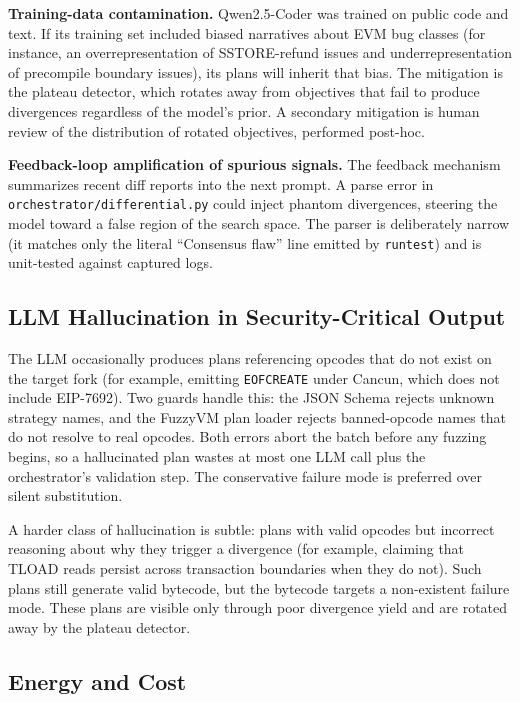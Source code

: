 \documentclass[conference]{IEEEtran}
\begin{document}
\textbf{Training-data contamination.} Qwen2.5-Coder was trained on public code and text. If its training set included biased narratives about EVM bug classes (for instance, an overrepresentation of SSTORE-refund issues and underrepresentation of precompile boundary issues), its plans will inherit that bias. The mitigation is the plateau detector, which rotates away from objectives that fail to produce divergences regardless of the model's prior. A secondary mitigation is human review of the distribution of rotated objectives, performed post-hoc.

\textbf{Feedback-loop amplification of spurious signals.} The feedback mechanism summarizes recent diff reports into the next prompt. A parse error in \texttt{orchestrator/differential.py} could inject phantom divergences, steering the model toward a false region of the search space. The parser is deliberately narrow (it matches only the literal ``Consensus flaw'' line emitted by \texttt{runtest}) and is unit-tested against captured logs.

\subsection{LLM Hallucination in Security-Critical Output}

The LLM occasionally produces plans referencing opcodes that do not exist on the target fork (for example, emitting \texttt{EOFCREATE} under Cancun, which does not include EIP-7692). Two guards handle this: the JSON Schema rejects unknown strategy names, and the FuzzyVM plan loader rejects banned-opcode names that do not resolve to real opcodes. Both errors abort the batch before any fuzzing begins, so a hallucinated plan wastes at most one LLM call plus the orchestrator's validation step. The conservative failure mode is preferred over silent substitution.

A harder class of hallucination is subtle: plans with valid opcodes but incorrect reasoning about why they trigger a divergence (for example, claiming that TLOAD reads persist across transaction boundaries when they do not). Such plans still generate valid bytecode, but the bytecode targets a non-existent failure mode. These plans are visible only through poor divergence yield and are rotated away by the plateau detector.

\subsection{Energy and Cost}
\end{document}
